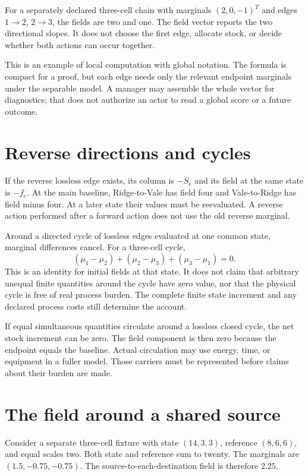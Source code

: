 For a separately declared three-cell chain with marginals \((2,0,-1)^T\) and edges \(1\to2\), \(2\to3\), the fields are two and one. The field vector reports the two directional slopes. It does not choose the first edge, allocate stock, or decide whether both actions can occur together.

This is an example of local computation with global notation. The formula is compact for a proof, but each edge needs only the relevant endpoint marginals under the separable model. A manager may assemble the whole vector for diagnostics; that does not authorize an actor to read a global score or a future outcome.

\section{Reverse directions and cycles}
If the reverse lossless edge exists, its column is \(-S_e\) and its field at the same state is \(-f_e\). At the main baseline, Ridge-to-Vale has field four and Vale-to-Ridge has field minus four. At a later state their values must be reevaluated. A reverse action performed after a forward action does not use the old reverse marginal.

Around a directed cycle of lossless edges evaluated at one common state, marginal differences cancel. For a three-cell cycle,
\begin{equation}
 (\mu_1-\mu_2)+(\mu_2-\mu_3)+(\mu_3-\mu_1)=0.
\end{equation}
This is an identity for initial fields at that state. It does not claim that arbitrary unequal finite quantities around the cycle have zero value, nor that the physical cycle is free of real process burden. The complete finite state increment and any declared process costs still determine the account.

If equal simultaneous quantities circulate around a lossless closed cycle, the net stock increment can be zero. The field component is then zero because the endpoint equals the baseline. Actual circulation may use energy, time, or equipment in a fuller model. Those carriers must be represented before claims about their burden are made.

\section{The field around a shared source}
Consider a separate three-cell fixture with state \((14,3,3)\), reference \((8,6,6)\), and equal scales two. Both state and reference sum to twenty. The marginals are \((1.5,-0.75,-0.75)\). The source-to-each-destination field is therefore \(2.25\).

